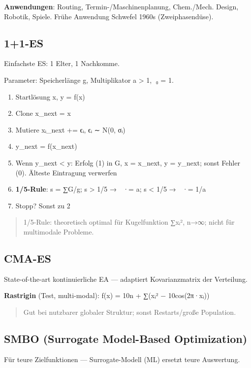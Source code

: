\documentclass[11pt, a4paper]{article}
\begin{document}
\textbf{Anwendungen}: Routing, Termin-/Maschinenplanung, Chem./Mech. Design, Robotik, Spiele. Frühe Anwendung Schwefel 1960s (Zweiphasendüse).



\subsection{1+1-ES}

Einfachste ES: 1 Elter, 1 Nachkomme.


Parameter: Speicherlänge g, Multiplikator a > 1, σ⃗₀ = 1⃗.

\begin{enumerate}
  \item Startlösung x⃗, y = f(x⃗)
  \item Clone x⃗\_next = x⃗
  \item Mutiere xᵢ\_next += ϵᵢ, ϵᵢ ∼ N(0, σᵢ)
  \item y\_next = f(x⃗\_next)
  \item Wenn y\_next < y: Erfolg (1) in G, x⃗ = x⃗\_next, y = y\_next; sonst Fehler (0). Älteste Eintragung verwerfen
  \item \textbf{1/5-Rule}: s = ∑G/g; s > 1/5 → σ⃗ ·= a; s < 1/5 → σ⃗ ·= 1/a
  \item Stopp? Sonst zu 2
\end{enumerate}

\begin{quote}
1/5-Rule: theoretisch optimal für Kugelfunktion ∑xᵢ², n→∞; nicht für multimodale Probleme.
\end{quote}


\subsection{CMA-ES}

State-of-the-art kontinuierliche EA — adaptiert Kovarianzmatrix der Verteilung.


\textbf{Rastrigin} (Test, multi-modal): f(x⃗) = 10n + ∑(xᵢ² − 10cos(2π·xᵢ))


\begin{quote}
Gut bei nutzbarer globaler Struktur; sonst Restarts/große Population.
\end{quote}


\subsection{SMBO (Surrogate Model-Based Optimization)}

Für teure Zielfunktionen — Surrogate-Modell (ML) ersetzt teure Auswertung.
\end{document}
